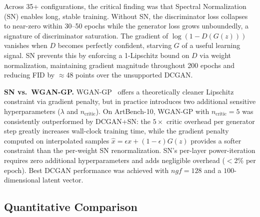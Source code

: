 \documentclass[runningheads]{llncs}
\begin{document}
Across 35+ configurations, the critical finding was that Spectral Normalization
(SN) enables long, stable training. Without SN, the discriminator loss collapses
to near-zero within 30--50 epochs while the generator loss grows unboundedly,
a signature of discriminator saturation. The gradient of $\log(1-D(G(z)))$
vanishes when $D$ becomes perfectly confident, starving $G$ of a useful learning
signal. SN prevents this by enforcing a 1-Lipschitz bound on $D$ via weight
normalization, maintaining gradient magnitude throughout 200 epochs and reducing
FID by $\approx$48 points over the unsupported DCGAN.

\noindent\textbf{SN vs.\ WGAN-GP.}
WGAN-GP~\cite{gulrajani2017} offers a theoretically cleaner Lipschitz constraint via
gradient penalty, but in practice introduces two additional sensitive hyperparameters
($\lambda$ and $n_\text{critic}$). On ArtBench-10, WGAN-GP with $n_\text{critic}=5$
was consistently outperformed by DCGAN+SN: the $5{\times}$ critic overhead per
generator step greatly increases wall-clock training time, while the gradient
penalty computed on interpolated samples $\hat{x}=\epsilon x + (1-\epsilon)G(z)$
provides a softer constraint than the per-weight SN renormalization. SN's
per-layer power-iteration requires zero additional hyperparameters and adds
negligible overhead ($<$2\% per epoch). Best DCGAN performance was achieved
with $ngf=128$ and a $100$-dimensional latent vector.

\subsection{Quantitative Comparison}\label{sec:quant}
\end{document}
